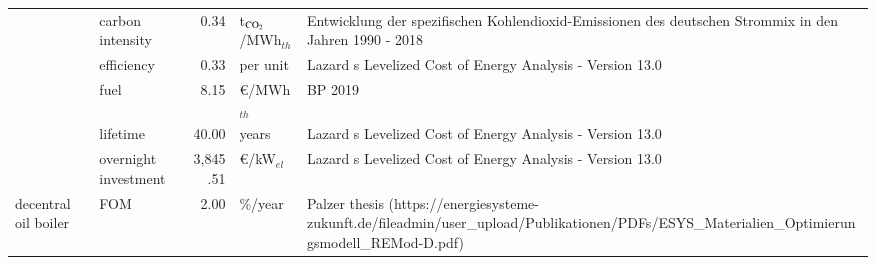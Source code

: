 \begin{longtable}{p{4cm}p{4cm}rp{3cm}p{10cm}}
                      & carbon intensity &         0.34 &     t$_{\ce{CO2}}$/MWh$_{th}$ &                                                                                                                                                                                                                                Entwicklung der spezifischen Kohlendioxid-Emissionen des deutschen Strommix in den Jahren 1990 - 2018 \\
                      & efficiency &         0.33 &                      per unit &                                                                                                                                                                                                                                                                            Lazard s Levelized Cost of Energy Analysis - Version 13.0 \\
                      & fuel &         8.15 &              \euro/MWh$_{th}$ &                                                                                                                                                                                                                                                                                                                              BP 2019 \\
                      & lifetime &        40.00 &                         years &                                                                                                                                                                                                                                                                            Lazard s Levelized Cost of Energy Analysis - Version 13.0 \\
                      & overnight investment &     3,845.51 &               \euro/kW$_{el}$ &                                                                                                                                                                                                                                                                            Lazard s Levelized Cost of Energy Analysis - Version 13.0 \\
decentral oil boiler & FOM &         2.00 &                       \%/year &                                                                                                                                                                                       Palzer thesis (https://energiesysteme-zukunft.de/fileadmin/user\_upload/Publikationen/PDFs/ESYS\_Materialien\_Optimierungsmodell\_REMod-D.pdf) \\

\end{longtable}
